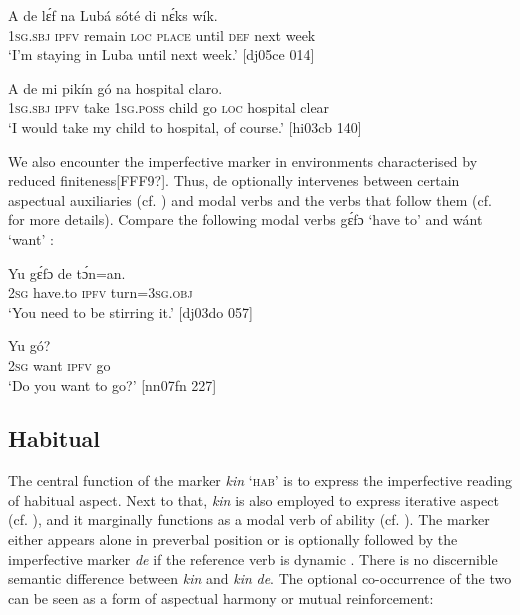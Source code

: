 \ea%
    \label{ex:key:338}
    \gll A    de  lɛ́f    na  Lubá  sóté    di  nɛ́ks    wík.\\
\textsc{1sg.sbj}  \textsc{ipfv}  remain  \textsc{loc}  \textsc{place}  until  \textsc{def}  next    week\\

\glt ‘I’m staying in Luba until next week.’ [dj05ce 014]
\z


\ea%
    \label{ex:key:339}
    \gll \MakeUppercase{A}   de  mi    pikín  gó  na  hospital  claro.\\
\textsc{1sg.sbj}  \textsc{ipfv}  take  \textsc{1sg.poss}  child  go  \textsc{loc}  hospital  clear\\

\glt ‘I would take my child to hospital, of course.’ [hi03cb 140]
\z

We also encounter the imperfective marker in environments characterised by reduced finiteness[FFF9?]. Thus, de optionally intervenes between certain aspectual auxiliaries (cf. ) and modal verbs and the verbs that follow them (cf.  for more details). Compare the following modal verbs gɛ́fɔ ‘have to’  and wánt ‘want’ :


\ea%
    \label{ex:key:340}
    \gll Yu  gɛ́fɔ    de  tɔ́n=an.\\
\textsc{2sg}  have.to  \textsc{ipfv}  turn=\textsc{3sg.obj}\\

\glt ‘You need to be stirring it.’ [dj03do 057]
\z


\ea%
    \label{ex:key:341}
    \gll Yu     gó?\\
\textsc{2sg}  want  \textsc{ipfv}  go\\


\glt ‘Do you want to go?’ [nn07fn 227]\\
\z
\subsection{Habitual}\label{sec:6.3.5}

The central function of the marker \textit{kin} ‘\textsc{hab}’ is to express the imperfective reading of habitual aspect. Next to that, \textit{kin} is also employed to express iterative aspect (cf. ), and it marginally functions as a modal verb of ability (cf. ). The marker either appears alone in preverbal position  or is optionally followed by the imperfective marker \textit{de} if the reference verb is dynamic . There is no discernible semantic difference between \textit{kin} and \textit{kin} \textit{de}. The optional co-occurrence of the two can be seen as a form of aspectual harmony or mutual reinforcement:



